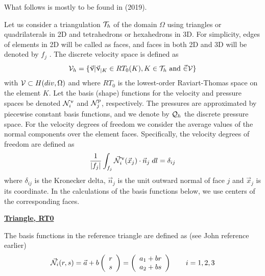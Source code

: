\newpage
What follows is mostly to be found in \textcite{weso19} (2019).

Let us consider a triangulation ${\cal T}_h$ of the domain $\Omega$ 
using triangles or quadrilaterals in 2D and tetrahedrons or
hexahedrons in 3D. For simplicity, edges of elements in 2D will be called as faces, 
and faces in both 2D and 3D will be denoted by $f_j$ . The discrete velocity space is defined as
\[
{\cal V}_h = \{ \vec{\upnu} | \vec{\upnu}_{|K}  \in RT_0(K) , K\in {\cal T}_h \text{ and } \vec\in {\cal V} \}
\]
with ${\cal V} \subset H(div,\Omega)$ and
where $RT_0$ is the lowest-order Raviart-Thomas space on the element $K$. 
Let the basis (shape) functions for the velocity and pressure spaces be denoted ${\mathcal{N}}^\upnu_i$ and 
${\mathcal{N}}^p_j$, respectively. The pressures are approximated by piecewise
constant basis functions, and we denote by ${\cal Q}_h$ the discrete pressure space. For the velocity degrees of freedom we
consider the average values of the normal components over the element faces. Specifically, the velocity degrees of
freedom are defined as
\begin{equation}
\frac{1}{|f_j|} \int_{f_j} \vec{{\mathcal{N}}}^\upnu_i( \vec{x}_j) \cdot \vec{n}_j \; dl = \delta_{ij} 
\label{eq:RTbfdef}
\end{equation}
where $\delta_{ij}$ is the Kronecker delta, $\vec{n}_j$ is the unit outward normal of face $j$ 
and $\vec{x}_j$ is its coordinate. In the calculations
of the basis functions below, we use centers of the corresponding faces.

\underline{\bf Triangle, RT0}

\begin{center}
\end{center}


The basis functions in the reference triangle are defined as (see John reference earlier)
\[
\vec{{\mathcal{N}}}_i(r,s)
=\vec{a} + b  \left(\begin{array}{c} r\\s \end{array}\right)
=\left(\begin{array}{c} a_1+b r \\ a_2 + b s \end{array}\right)
\qquad i=1,2,3
\]

